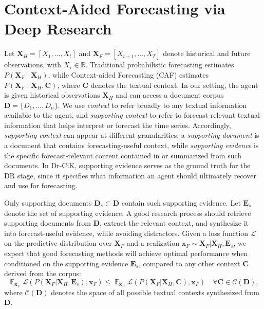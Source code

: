 \documentclass[]{servicenow}
\begin{document}
\section{Context-Aided Forecasting via Deep Research}








Let $\mathbf{X}_H=[X_1,\dots,X_t]$ and $\mathbf{X}_F=[X_{t+1},\dots,X_T]$ denote historical and future observations, with $X_\tau \in \mathbb{R}$.
Traditional probabilistic forecasting estimates $P(\mathbf{X}_F \mid \mathbf{X}_H)$, while Context-aided Forecasting (CAF) estimates $P(\mathbf{X}_F \mid \mathbf{X}_H,\mathbf{C})$, where $\mathbf{C}$ denotes the textual context.
In our setting, the agent is given historical observations $\mathbf{X}_H$ and can access a document corpus $\mathbf{D}=\{D_1,\dots,D_n\}$.
We use \emph{context} to refer broadly to any textual information available to the agent, and \emph{supporting context} to refer to forecast-relevant textual information that helps interpret or forecast the time series.
Accordingly, \emph{supporting context} can appear at different granularities: a \emph{supporting document} is a document that contains forecasting-useful context, while \emph{supporting evidence} is the specific forecast-relevant content contained in or summarized from such documents.
In Dr-CiK, supporting evidence serves as the ground truth for the DR stage, since it specifies what information an agent should ultimately recover and use for forecasting.





Only supporting documents $\mathbf{D}_s \subset \mathbf{D}$ contain such supporting evidence.
Let $\mathbf{E}_s$ denote the set of supporting evidence.
A good research process should retrieve supporting documents from $\mathbf{D}$, extract the relevant context, and synthesize it into forecast-useful evidence, while avoiding distractors.
Given a loss function $\mathcal{L}$ on the predictive distribution over $\mathbf{X}_F$ and a realization $\mathbf{x}_F \sim \mathbf{X}_F|\mathbf{X}_H,\mathbf{E}_s$, we expect that good forecasting methods will achieve optimal performance when conditioned on the supporting evidence $\mathbf{E}_s$, compared to any other context $\mathbf{C}$ derived from the corpus:
\begin{equation}
    \mathop{\mathbb{E}}_{\mathbf{x}_F} \mathcal{L}\left(
        P(\mathbf{X}_F|\mathbf{X}_H,\mathbf{E}_s), \mathbf{x}_F
    \right)
    \le
    \mathop{\mathbb{E}}_{\mathbf{x}_F} \mathcal{L}\left(
        P(\mathbf{X}_F|\mathbf{X}_H,\mathbf{C}), \mathbf{x}_F
    \right)
    \quad \forall \mathbf{C} \in \mathcal{C}(\mathbf{D}),
\end{equation}
where $\mathcal{C}(\mathbf{D})$ denotes the space of all possible textual contexts synthesized from $\mathbf{D}$.
\end{document}
